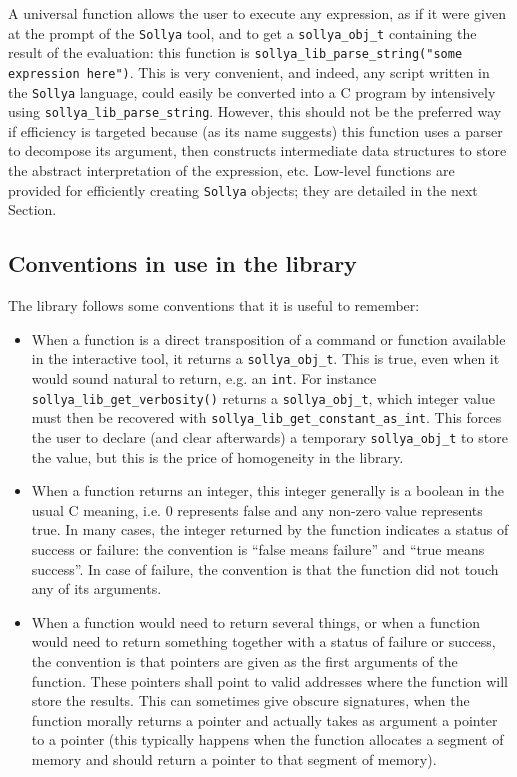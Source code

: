 \documentclass[a4paper]{article}
\newcommand{\sollya}{\texttt{Sollya}\xspace}
\begin{document}
A universal function allows the user to execute any expression, as if it were given at the prompt of the \sollya tool, and to get a \texttt{sollya\_obj\_t} containing the result of the evaluation: this function is \texttt{sollya\_lib\_parse\_string("some expression here")}. This is very convenient, and indeed, any script written in the \sollya language, could easily be converted into a C program by intensively using \texttt{sollya\_lib\_parse\_string}. However, this should not be the preferred way if efficiency is targeted because (as its name suggests) this function uses a parser to decompose its argument, then constructs intermediate data structures to store the abstract interpretation of the expression, etc. Low-level functions are provided for efficiently creating \sollya objects; they are detailed in the next Section.

\subsection{Conventions in use in the library}
The library follows some conventions that it is useful to remember:
\begin{itemize}
\item When a function is a direct transposition of a command or function available in the interactive tool, it returns a \verb|sollya_obj_t|. This is true, even when it would sound natural to return, e.g. an \verb|int|. For instance \verb|sollya_lib_get_verbosity()| returns a \verb|sollya_obj_t|, which integer value must then be recovered with \verb|sollya_lib_get_constant_as_int|. This forces the user to declare (and clear afterwards) a temporary \verb|sollya_obj_t| to store the value, but this is the price of homogeneity in the library.
\item When a function returns an integer, this integer generally is a boolean in the usual C meaning, i.e. $0$ represents false and any non-zero value represents true. In many cases, the integer returned by the function indicates a status of success or failure: the convention is ``false means failure'' and ``true means success''. In case of failure, the convention is that the function did not touch any of its arguments.
\item When a function would need to return several things, or when a function would need to return something together with a status of failure or success, the convention is that pointers are given as the first arguments of the function. These pointers shall point to valid addresses where the function will store the results. This can sometimes give obscure signatures, when the function morally returns a pointer and actually takes as argument a pointer to a pointer (this typically happens when the function allocates a segment of memory and should return a pointer to that segment of memory).
\end{itemize}
\end{document}
